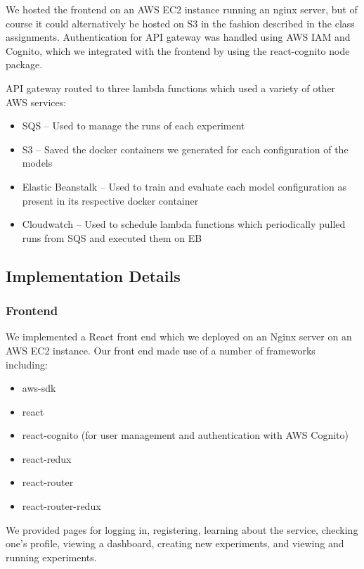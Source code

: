 \documentclass[12pt,oneside]{amsart}
\begin{document}
\begin{multicols}{2}
We hosted the frontend on an AWS EC2 instance running an nginx server, but of course it could alternatively be hosted on S3 in the fashion described in the class assignments.
Authentication for API gateway was handled using AWS IAM and Cognito, which we integrated with the frontend by using the react-cognito node package.

API gateway routed to three lambda functions which used a variety of other AWS services:

\begin{itemize}
  \item SQS -- Used to manage the runs of each experiment
  \item S3 -- Saved the docker containers we generated for each configuration of the models
  \item Elastic Beanstalk -- Used to train and evaluate each model configuration as present in its respective docker container
  \item Cloudwatch -- Used to schedule lambda functions which periodically pulled runs from SQS and executed them on EB
\end{itemize}

\subsection{Implementation Details} \label{ch:solidity_work}

\end{multicols}
\subsubsection{Frontend}
We implemented a React front end which we deployed on an Nginx server on an AWS EC2 instance.
Our front end made use of a number of frameworks including:

\begin{itemize}
  \item aws-sdk
  \item react
  \item react-cognito (for user management and authentication with AWS Cognito)
  \item react-redux
  \item react-router
  \item react-router-redux
\end{itemize}

We provided pages for logging in, registering, learning about the service, checking one's profile, viewing a dashboard, creating new experiments, and viewing and running experiments.
\end{document}
